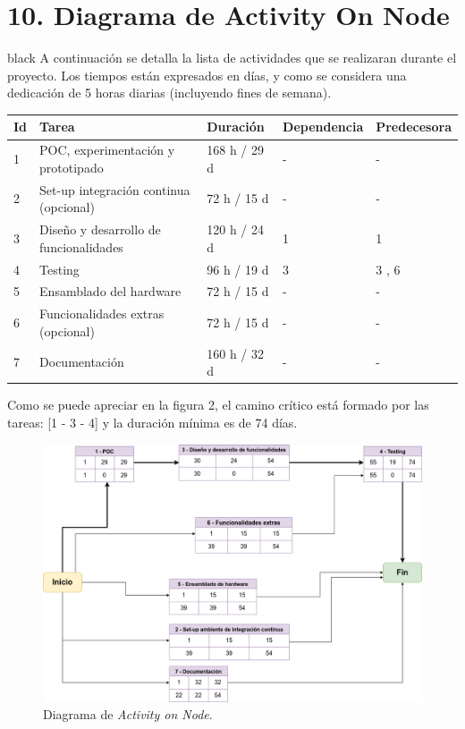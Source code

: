 \documentclass[
11pt, %
]{charter}
\begin{document}
\section{10. Diagrama de Activity On Node}
\label{sec:AoN}

\begin{consigna}{black}
A continuación se detalla la lista de actividades que se realizaran durante el proyecto. Los tiempos están expresados en días, y como se considera una dedicación de 5 horas diarias (incluyendo fines de semana). 

\begin{table}[ht]
\begin{tabularx}{\linewidth}{@{}|l|X|l|l|l|@{}}
\hline
\rowcolor[HTML]{C0C0C0} 
Id	& Tarea           										& Duración 				 	& Dependencia	& Predecesora 	\\ \hline

1	& POC, experimentación y prototipado					& 168 h / 29 d				& -				&  -      		\\ \hline
2	& Set-up integración continua (opcional)				& 72 h / 15 d   			& -        		&  -			\\ \hline
3	& Diseño y desarrollo de funcionalidades    			& 120 h / 24 d				& 1			 	& 1				\\ \hline
4	& Testing								    			& 96 h / 19 d				& 3				& 3 , 6			\\ \hline
5	& Ensamblado del hardware				    			& 72 h / 15 d				& -				& -				\\ \hline
6	& Funcionalidades extras (opcional)						& 72 h / 15 d				& -				& - 			\\ \hline
7	& Documentación    										& 160 h / 32 d				& -			 	& -				\\ \hline

\end{tabularx}
\end{table}


Como se puede apreciar en la figura 2, el camino crítico está formado por las tareas: [1 - 3 - 4] y la duración mínima es de 74 días.


\begin{figure}[htpb]
\centering 
\includegraphics[width=.9\textwidth]{./Figuras/ProyectoFinal-Page-8.png}
\caption{Diagrama de \textit{Activity on Node}.}
\label{fig:diagBloques}
\end{figure}
\end{consigna}
\end{document}
